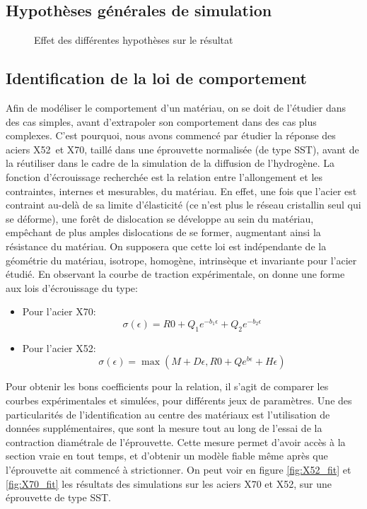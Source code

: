 \documentclass[a4paper, french, 11pt]{article}
\begin{document}
    \subsection{Hypothèses générales de simulation}

    \begin{figure}[hbt]
        \centering
        \caption{Effet des différentes hypothèses sur le résultat}
        \label{anim:effet_3D}
    \end{figure}

    \subsection{Identification de la loi de comportement}
    Afin de modéliser le comportement d'un matériau, on se doit de l'étudier dans des cas simples, avant d'extrapoler son comportement dans des cas plus complexes.
    C'est pourquoi, nous avons commencé par étudier la réponse des aciers X52 et X70, taillé dans une éprouvette normalisée (de type SST), avant de la réutiliser dans le cadre de la simulation de la diffusion de l'hydrogène.
    La fonction d'écrouissage recherchée est la relation entre l'allongement et les contraintes, internes et mesurables, du matériau.
    En effet, une fois que l'acier est contraint au-delà de sa limite d'élasticité (ce n'est plus le réseau cristallin seul qui se déforme), une \og forêt \fg de dislocation se développe au sein du matériau, empêchant de plus amples dislocations de se former, augmentant ainsi la résistance du matériau.
    On supposera que cette loi est indépendante de la géométrie du matériau, isotrope, homogène, intrinsèque et invariante pour l'acier étudié.
    En observant la courbe de traction expérimentale, on donne une forme aux lois d'écrouissage du type:
    \begin{itemize}
        \item Pour l'acier X70:
        \[
            \sigma(\epsilon) = R0 + Q_1e^{-b_1\epsilon} + Q_2e^{-b_2\epsilon}
        \]
        \item Pour l'acier X52:
        \[
            \sigma(\epsilon) = \max(M + D\epsilon, R0 + Qe^{b\epsilon} + H\epsilon)
        \]  
    \end{itemize}
    Pour obtenir les bons coefficients pour la relation, il s'agit de comparer les courbes expérimentales et simulées, pour différents jeux de paramètres. 
    Une des particularités de l'identification au centre des matériaux est l'utilisation de données supplémentaires, que sont la mesure tout au long de l'essai de la contraction diamétrale de l'éprouvette.
    Cette mesure permet d'avoir accès à la section vraie en tout temps, et d'obtenir un modèle fiable même après que l'éprouvette ait commencé à strictionner.
    On peut voir en figure \ref{fig:X52_fit} et \ref{fig:X70_fit} les résultats des simulations sur les aciers X70 et X52, sur une éprouvette de type SST.
\end{document}
